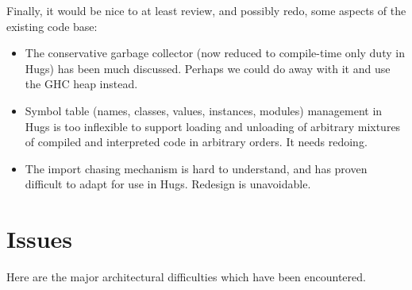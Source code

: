 Finally, it would be nice to at least review, and possibly redo, some
aspects of the existing code base:
\begin{itemize}
\item The conservative garbage collector (now reduced to compile-time only
  duty in Hugs) has been much discussed.  Perhaps we could
  do away with it and use the GHC heap instead.

\item Symbol table (names, classes, values, instances, modules) management
  in Hugs is too inflexible to support loading and unloading of
  arbitrary mixtures of compiled and interpreted code in arbitrary
  orders.  It needs redoing.

\item The import chasing mechanism is hard to understand, and has proven
  difficult to adapt for use in Hugs.  Redesign is unavoidable.
\end{itemize}



\section{Issues}
Here are the major architectural difficulties which have been encountered.

